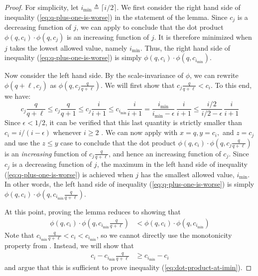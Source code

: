 \begin{proof}
    For simplicity, let $i_{\min} \triangleq \lceil i/2 \rceil$. We first consider the right hand side of inequality (\ref{eq:q-plus-one-is-worse}) in the statement of the lemma. Since $c_j$ is a decreasing function of $j$, we can apply  to conclude that the dot product $\phi(q, c_i) \cdot \phi(q, c_j)$ is an increasing function of $j$. It is therefore minimized when $j$ takes the lowest allowed value, namely $i_{\min}$. Thus, the right hand side of inequality (\ref{eq:q-plus-one-is-worse}) is simply $\phi(q, c_i) \cdot \phi(q, c_{i_{\min}})$.

    Now consider the left hand side. By the scale-invariance of $\phi$, we can rewrite $\phi(q+\ell, c_j)$ as $\phi(q, c_j \frac{q}{q+\ell})$. We will first show that $c_j \frac{q}{q+\ell} < c_i$. To this end, we have:
    \[
        c_j \frac{q}{q+\ell}
          \leq c_j \frac{q}{q+1}
          \leq c_j \frac{i}{i+1}
          \leq c_{i_{\min}} \frac{i}{i+1}
          = \frac{i_{\min}}{i_{\min}-\epsilon} \, \frac{i}{i+1}
          \leq \frac{i/2}{i/2-\epsilon} \, \frac{i}{i+1}
    \]
    Since $\epsilon < 1/2$, it can be verified that this last quantity is strictly smaller than $c_i = i / (i - \epsilon)$ whenever $i \geq 2$ . We can now apply  with $x = q, y = c_i,$ and $z = c_j$ and use the $z \leq y$ case to conclude that the dot product $\phi(q, c_i) \cdot \phi(q, c_j \frac{q}{q+\ell})$ is an \emph{increasing} function of $c_j \frac{q}{q+\ell}$, and hence an increasing function of $c_j$. Since $c_j$ is a decreasing function of $j$, the maximum in the left hand side of inequality (\ref{eq:q-plus-one-is-worse}) is achieved when $j$ has the smallest allowed value, $i_{\min}$. In other words, the left hand side of inequality (\ref{eq:q-plus-one-is-worse}) is simply $\phi(q, c_i) \cdot \phi(q, c_{i_{\min}} \frac{q}{q+\ell})$.

    At this point, proving the lemma reduces to showing that
    \begin{align}
        \label{eq:dot-product-at-imin}
        \phi(q, c_i) \cdot \phi(q, c_{i_{\min}} \frac{q}{q+\ell})
          & < \phi(q, c_i) \cdot \phi(q, c_{i_{\min}})
    \end{align}
    Note that $c_{i_{\min}} \frac{q}{q+\ell} < c_i < c_{i_{\min}}$, so we cannot directly use the monotonicity property from . Instead, we will show that
    \begin{align}
        \label{eq:c_imin-is-closer}
        c_i - c_{i_{\min}} \frac{q}{q+\ell}
          & \geq c_{i_{\min}} - c_i
    \end{align}
    and argue that this is sufficient to prove inequality (\ref{eq:dot-product-at-imin}).


\end{proof}
